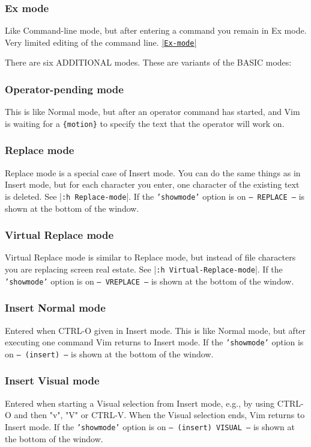 \subsubsection{Ex mode}
Like Command-line mode, but after entering a command you remain in Ex mode.
Very limited editing of the command line.
\hyperref[Ex-mode]{|\texttt{Ex-mode}|}

There are six ADDITIONAL modes.  These are variants of the BASIC modes:


\subsubsection{Operator-pending mode}
\label{Operator-pending}
\label{Operator-pending-mode}
This is like Normal mode, but after an operator command has started, and Vim is waiting for a \texttt{\{motion\}} to specify the text that the operator will work on.

\subsubsection{Replace mode}
Replace mode is a special case of Insert mode.
You can do the same things as in Insert mode, but for each character you enter, one character of the existing text is deleted.
See |\texttt{:h Replace-mode}|.
If the \texttt{'showmode'} option is on \texttt{-- REPLACE --} is shown at the bottom of the window.

\subsubsection{Virtual Replace mode}
Virtual Replace mode is similar to Replace mode, but instead of file characters you are replacing screen real estate.
See |\texttt{:h Virtual-Replace-mode}|.
If the \texttt{'showmode'} option is on \texttt{-- VREPLACE --} is shown at the bottom of the window.

\subsubsection{Insert Normal mode}
Entered when CTRL-O given in Insert mode.
This is like Normal mode, but after executing one command Vim returns to Insert mode.
If the \texttt{'showmode'} option is on \texttt{-- (insert) --} is shown at the bottom of the window.

\subsubsection{Insert Visual mode}
Entered when starting a Visual selection from Insert mode, e.g., by using CTRL-O and then "v", "V" or CTRL-V.
When the Visual selection ends, Vim returns to Insert mode.
If the \texttt{'showmode'} option is on \texttt{-- (insert) VISUAL --} is shown at the bottom of the window.

